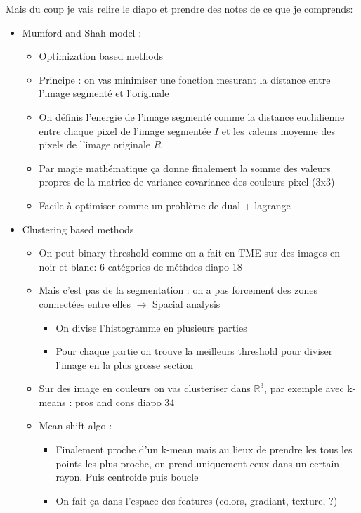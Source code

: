 \documentclass{article}
\theoremstyle{plain}%
\theoremstyle{definition}
\theoremstyle{remark}
\begin{document}
Mais du coup je vais relire le diapo et prendre des notes de ce que je comprends:
\begin{itemize}
    \item Mumford and Shah model :
    \begin{itemize}
        \item Optimization based methods 
        \item Principe : on vas minimiser une fonction mesurant la distance entre l'image segmenté et l'originale
        \item On définis l'energie de l'image segmenté comme la distance euclidienne entre chaque pixel de l'image segmentée $ I $  et les valeurs moyenne des pixels de l'image originale $ R $ 
        \item Par magie mathématique ça donne finalement la somme des valeurs propres de la matrice de variance covariance des couleurs pixel (3x3)
        \item Facile à optimiser comme un problème de dual + lagrange
    \end{itemize}
    \item Clustering based methods 
    \begin{itemize}
        \item On peut binary threshold comme on a fait en TME sur des images en noir et blanc: 6 catégories de méthdes diapo 18
        \item Mais c'est pas de la segmentation : on a pas forcement des zones connectées entre elles $\rightarrow$ Spacial analysis
        \begin{itemize}
            \item On divise l'histogramme en plusieurs parties 
            \item Pour chaque partie on trouve la meilleurs threshold pour diviser l'image en la plus grosse section
        \end{itemize}
        \item Sur des image en couleurs on vas clusteriser dans $ \mathbb{R}^3 $, par exemple avec k-means : pros and cons diapo 34
        \item Mean shift algo : 
        \begin{itemize}
            \item Finalement proche d'un k-mean mais au lieux de prendre les tous les points les plus proche, on prend uniquement ceux dans un certain rayon. Puis centroide puis boucle
            \item On fait ça dans l'espace des features (colors, gradiant, texture, ?)

\end{itemize}
\end{itemize}
\end{itemize}
\end{document}
